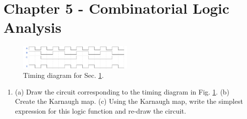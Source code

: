 \documentclass[10pt]{article}
\begin{document}
\section{Chapter 5 - Combinatorial Logic Analysis}
\label{sec:comb}
\begin{figure}[ht]
\centering
\includegraphics[width=0.5\textwidth]{timingExample3.pdf}
\caption{\label{fig:timing3} Timing diagram for Sec. \ref{sec:comb}.}
\end{figure}
\begin{enumerate}
\item (a) Draw the circuit corresponding to the timing diagram in Fig. \ref{fig:timing3}.  (b) Create the Karnaugh map.  (c) Using the Karnaugh map, write the simplest expression for this logic function and re-draw the circuit.
\end{enumerate}
\end{document}
